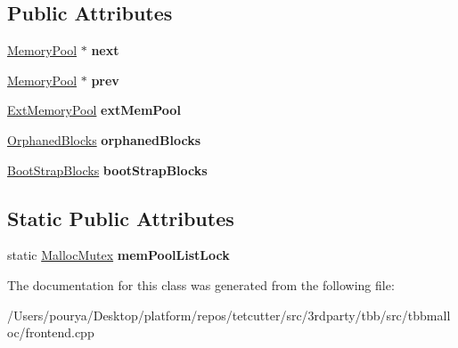 \subsection*{Public Attributes}
\begin{DoxyCompactItemize}
\item 
\hypertarget{classrml_1_1internal_1_1MemoryPool_abe53d310d639ead4d055119d5a2b5552}{}\hyperlink{classrml_1_1internal_1_1MemoryPool}{Memory\+Pool} $\ast$ {\bfseries next}\label{classrml_1_1internal_1_1MemoryPool_abe53d310d639ead4d055119d5a2b5552}

\item 
\hypertarget{classrml_1_1internal_1_1MemoryPool_aee4c5ad03dce6827a776cedbf53339d9}{}\hyperlink{classrml_1_1internal_1_1MemoryPool}{Memory\+Pool} $\ast$ {\bfseries prev}\label{classrml_1_1internal_1_1MemoryPool_aee4c5ad03dce6827a776cedbf53339d9}

\item 
\hypertarget{classrml_1_1internal_1_1MemoryPool_a93f7cd65f7ae8f1608a846cded95cd7c}{}\hyperlink{structrml_1_1internal_1_1ExtMemoryPool}{Ext\+Memory\+Pool} {\bfseries ext\+Mem\+Pool}\label{classrml_1_1internal_1_1MemoryPool_a93f7cd65f7ae8f1608a846cded95cd7c}

\item 
\hypertarget{classrml_1_1internal_1_1MemoryPool_a99e89c8226ec455a9f145b45f4fcbcf9}{}\hyperlink{classrml_1_1internal_1_1OrphanedBlocks}{Orphaned\+Blocks} {\bfseries orphaned\+Blocks}\label{classrml_1_1internal_1_1MemoryPool_a99e89c8226ec455a9f145b45f4fcbcf9}

\item 
\hypertarget{classrml_1_1internal_1_1MemoryPool_ab6031f40ff7011e056db5052cd88de22}{}\hyperlink{classrml_1_1internal_1_1BootStrapBlocks}{Boot\+Strap\+Blocks} {\bfseries boot\+Strap\+Blocks}\label{classrml_1_1internal_1_1MemoryPool_ab6031f40ff7011e056db5052cd88de22}

\end{DoxyCompactItemize}
\subsection*{Static Public Attributes}
\begin{DoxyCompactItemize}
\item 
\hypertarget{classrml_1_1internal_1_1MemoryPool_ae2f9869ec6e87cbdeabf13d365d49f62}{}static \hyperlink{classMallocMutex}{Malloc\+Mutex} {\bfseries mem\+Pool\+List\+Lock}\label{classrml_1_1internal_1_1MemoryPool_ae2f9869ec6e87cbdeabf13d365d49f62}

\end{DoxyCompactItemize}


The documentation for this class was generated from the following file\+:\begin{DoxyCompactItemize}
\item 
/\+Users/pourya/\+Desktop/platform/repos/tetcutter/src/3rdparty/tbb/src/tbbmalloc/frontend.\+cpp\end{DoxyCompactItemize}
